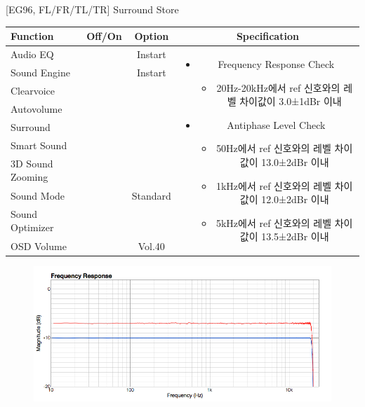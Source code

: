\documentclass{beamer}
\begin{document}
\begin{frame}[t]{[EG96, FL/FR/TL/TR] Surround Store}
\begin{tiny}
\begin{tabular}{@{}lccc@{}}
\toprule
Function & Off/On & Option & Specification \\
\midrule
Audio EQ & \color{black}{Off} & Instart &
\multirow{10}{60mm}{
\begin{itemize}\vspace{-3mm}
\item Frequency Response Check
	\begin{itemize}
	\item 20Hz-20kHz에서 ref 신호와의 레벨 차이값이 3.0±1dBr 이내
	\end{itemize}
\item Antiphase Level Check
	\begin{itemize}
	\item 50Hz에서 ref 신호와의 레벨 차이값이 13.0±2dBr 이내
	\item 1kHz에서 ref 신호와의 레벨 차이값이 12.0±2dBr 이내
	\item 5kHz에서 ref 신호와의 레벨 차이값이 13.5±2dBr 이내
	\end{itemize}
\end{itemize}
} \\
Sound Engine & \color{blue}{On} & Instart & \\
Clearvoice & \color{black}{Off} & & \\
Autovolume & \color{black}{Off} & & \\
Surround & \color{blue}{On} & & \\
Smart Sound & \color{black}{Off} & & \\
3D Sound Zooming & \color{black}{Off} & & \\
Sound Mode & \color{blue}{On} & Standard & \\
Sound Optimizer & \color{black}{Off} & & \\
OSD Volume & \color{blue}{On} & Vol.40 & \\
\midrule
\end{tabular}
\end{tiny}

\begin{figure}[b]
\includegraphics[height=0.4\textwidth]{figure/EG96/surround_store.png}
\end{figure}

\end{frame}
\end{document}
